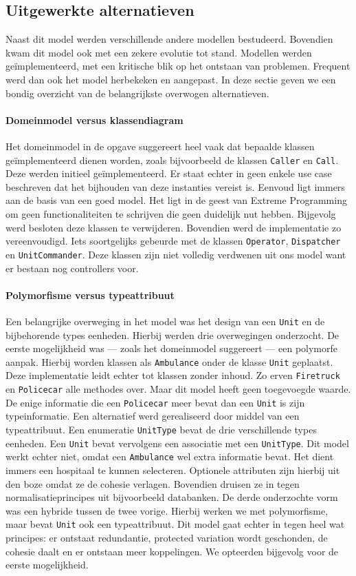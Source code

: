 \subsection{Uitgewerkte alternatieven}
Naast dit model werden verschillende andere modellen bestudeerd. Bovendien kwam dit model ook met een zekere evolutie tot stand. Modellen werden ge\"implementeerd, met een kritische blik op het ontstaan van problemen. Frequent werd dan ook het model herbekeken en aangepast. In deze sectie geven we een bondig overzicht van de belangrijkste overwogen alternatieven.
\paragraph{Domeinmodel versus klassendiagram}
Het domeinmodel in de opgave suggereert heel vaak dat bepaalde klassen ge\"implementeerd dienen worden, zoals bijvoorbeeld de klassen \verb+Caller+ en \verb+Call+. Deze werden initieel ge\"implementeerd. Er staat echter in geen enkele use case beschreven dat het bijhouden van deze instanties vereist is. Eenvoud ligt immers aan de basis van een goed model. Het ligt in de geest van Extreme Programming om geen functionaliteiten te schrijven die geen duidelijk nut hebben. Bijgevolg werd besloten deze klassen te verwijderen. Bovendien werd de implementatie zo vereenvoudigd. Iets soortgelijks gebeurde met de klassen \verb+Operator+, \verb+Dispatcher+ en \verb+UnitCommander+. Deze klassen zijn niet volledig verdwenen uit ons model want er bestaan nog controllers voor.
\paragraph{Polymorfisme versus typeattribuut}
Een belangrijke overweging in het model was het design van een \verb+Unit+ en de bijbehorende types eenheden. Hierbij werden drie overwegingen onderzocht. De eerste mogelijkheid was --- zoals het domeinmodel suggereert --- een polymorfe aanpak. Hierbij worden klassen als \verb+Ambulance+ onder de klasse \verb+Unit+ geplaatst. Deze implementatie leidt echter tot klassen zonder inhoud. Zo erven \verb+Firetruck+ en \verb+Policecar+ alle methodes over. Maar dit model heeft geen toegevoegde waarde. De enige informatie die een \verb+Policecar+ meer bevat dan een \verb+Unit+ is zijn typeinformatie. Een alternatief werd gerealiseerd door middel van een typeattribuut. Een enumeratie \verb+UnitType+ bevat de drie verschillende types eenheden. Een \verb+Unit+ bevat vervolgens een associatie met een \verb+UnitType+. Dit model werkt echter niet, omdat een \verb+Ambulance+ wel extra informatie bevat. Het dient immers een hospitaal te kunnen selecteren. Optionele attributen zijn hierbij uit den boze omdat ze de cohesie verlagen. Bovendien druisen ze in tegen normalisatieprincipes uit bijvoorbeeld databanken. De derde onderzochte vorm was een hybride tussen de twee vorige. Hierbij werken we met polymorfisme, maar bevat \verb+Unit+ ook een typeattribuut. Dit model gaat echter in tegen heel wat principes: er ontstaat redundantie, protected variation wordt geschonden, de cohesie daalt en er ontstaan meer koppelingen. We opteerden bijgevolg voor de eerste mogelijkheid.
\paragraph{}
